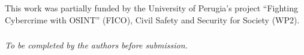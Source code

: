 \documentclass[runningheads]{llncs}
\begin{document}










\begin{credits}
\subsubsection{\ackname}
This work was partially funded by the University of Perugia's project
``Fighting Cybercrime with OSINT'' (FICO), Civil Safety and Security for
Society (WP2).
\subsubsection{\discintname}
\emph{To be completed by the authors before submission.}
\end{credits}


\end{document}
